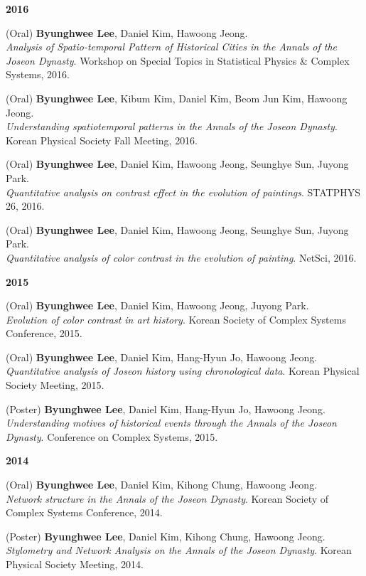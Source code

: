 \documentclass[10pt]{article}
\newenvironment{innerlist}[1][\enskip\textbullet]%
{\vspace{0.2\baselineskip}\begin{compactitem}[#1]}{\end{compactitem}\vspace{0.2\baselineskip}}
\begin{document}
\textbf{2016}
\begin{innerlist}
\item (Oral) \textbf{Byunghwee Lee}, Daniel Kim, Hawoong Jeong.\\
\textit{Analysis of Spatio-temporal Pattern of Historical Cities in the Annals of the Joseon Dynasty}. Workshop on Special Topics in Statistical Physics \& Complex Systems, 2016.

\item (Oral) \textbf{Byunghwee Lee}, Kibum Kim, Daniel Kim, Beom Jun Kim, Hawoong Jeong.\\
\textit{Understanding spatiotemporal patterns in the Annals of the Joseon Dynasty}. Korean Physical Society Fall Meeting, 2016.

\item (Oral) \textbf{Byunghwee Lee}, Daniel Kim, Hawoong Jeong, Seunghye Sun, Juyong Park.\\
\textit{Quantitative analysis on contrast effect in the evolution of paintings}. STATPHYS 26, 2016.

\item (Oral) \textbf{Byunghwee Lee}, Daniel Kim, Hawoong Jeong, Seunghye Sun, Juyong Park.\\
\textit{Quantitative analysis of color contrast in the evolution of painting}. NetSci, 2016.
\end{innerlist}

\textbf{2015}
\begin{innerlist}
\item (Oral) \textbf{Byunghwee Lee}, Daniel Kim, Hawoong Jeong, Juyong Park.\\
\textit{Evolution of color contrast in art history}. Korean Society of Complex Systems Conference, 2015.

\item (Oral) \textbf{Byunghwee Lee}, Daniel Kim, Hang-Hyun Jo, Hawoong Jeong.\\
\textit{Quantitative analysis of Joseon history using chronological data}. Korean Physical Society Meeting, 2015.

\item (Poster) \textbf{Byunghwee Lee}, Daniel Kim, Hang-Hyun Jo, Hawoong Jeong.\\
\textit{Understanding motives of historical events through the Annals of the Joseon Dynasty}. Conference on Complex Systems, 2015.
\end{innerlist}

\textbf{2014}
\begin{innerlist}
\item (Oral) \textbf{Byunghwee Lee}, Daniel Kim, Kihong Chung, Hawoong Jeong.\\
\textit{Network structure in the Annals of the Joseon Dynasty}. Korean Society of Complex Systems Conference, 2014.

\item (Poster) \textbf{Byunghwee Lee}, Daniel Kim, Kihong Chung, Hawoong Jeong.\\
\textit{Stylometry and Network Analysis on the Annals of the Joseon Dynasty}. Korean Physical Society Meeting, 2014.
\end{innerlist}
\end{document}
